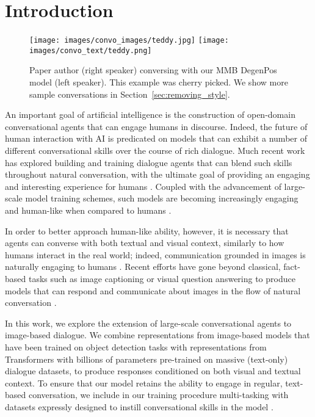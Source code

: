 \documentclass[11pt,a4paper]{article}
\begin{document}
\section{Introduction}

\begin{figure}[t!]
\centering
\texttt{[image: images/convo\_images/teddy.jpg]}
\texttt{[image: images/convo\_text/teddy.png]}
\caption{
Paper author (right speaker) conversing with our MMB DegenPos model (left speaker). This example was cherry picked. We show more sample conversations in Section~\ref{sec:removing_style}.
 \label{fig:cherry_convos1}
}
\end{figure}

An important goal of artificial intelligence is the construction of open-domain conversational agents that can engage humans in discourse. Indeed, the future of human interaction with AI is predicated on models that can exhibit a number of different conversational skills over the course of rich dialogue. Much recent work has explored building and training dialogue agents that can blend such skills throughout natural conversation, with the ultimate goal of providing an engaging and interesting experience for humans \cite{smith2020bst, shuster2019dialogue}. Coupled with the advancement of large-scale model training schemes, such models are becoming increasingly engaging and human-like when compared to humans \cite{zhang2019dialogpt,adiwardana2020meena, roller2020recipes}.


In order to better approach human-like ability, however,
it is necessary that agents can converse with both textual and visual context, similarly to how humans interact in the real world; 
indeed, communication grounded in images is naturally engaging to humans \cite{hu2014we}. Recent efforts have gone beyond classical, fact-based tasks such as image captioning or visual question answering \cite{antol2015vqa,das2017visual} to produce models that can respond and communicate about images in the flow of natural conversation \cite{shuster2020image,shuster2019dialogue}.


In this work, we explore the extension of large-scale conversational agents to image-based dialogue. We combine representations from image-based models that have been trained on object detection tasks \cite{Lu_2020_CVPR, NIPS2019_8297} with representations from Transformers with billions of parameters pre-trained on massive (text-only) dialogue datasets, to produce 
responses conditioned on both visual and textual context. To ensure that our model retains the ability to engage in regular, text-based conversation, we include in our training procedure multi-tasking with datasets expressly designed to instill conversational skills in the model \cite{smith2020bst}. 
\end{document}
